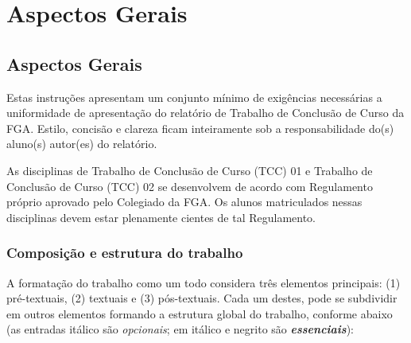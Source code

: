 \part{Aspectos Gerais}

\chapter[Aspectos Gerais]{Aspectos Gerais}

Estas instruções apresentam um conjunto mínimo de exigências necessárias a 
uniformidade de apresentação do relatório de Trabalho de Conclusão de Curso 
da FGA. Estilo, concisão e clareza ficam inteiramente sob a 
responsabilidade do(s) aluno(s) autor(es) do relatório.

As disciplinas de Trabalho de Conclusão de Curso (TCC) 01 e Trabalho de 
Conclusão de Curso (TCC) 02 se desenvolvem de acordo com Regulamento 
próprio aprovado pelo Colegiado da FGA. Os alunos matriculados nessas 
disciplinas devem estar plenamente cientes de tal Regulamento. 

\section{Composição e estrutura do trabalho}

A formatação do trabalho como um todo considera três elementos principais: 
(1) pré-textuais, (2) textuais e (3) pós-textuais. Cada um destes, pode se 
subdividir em outros elementos formando a estrutura global do trabalho, 
conforme abaixo (as entradas itálico são \textit{opcionais}; em itálico e
negrito são \textbf{\textit{essenciais}}):

